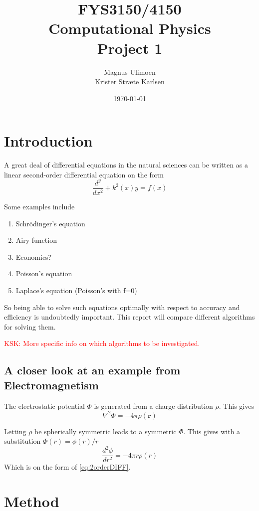 \documentclass[11pt,a4paper,english,draft]{article}
\title{FYS3150/4150\\Computational Physics\\Project 1}
\author{Magnus Ulimoen\\Krister Stræte Karlsen}
\date{\today}
\numberwithin{equation}{section}
\newcommand{\ve}[1]{\mathbf{#1}} %
\begin{document}
\maketitle

\section{Introduction}

A great deal of differential equations in the natural sciences can be written 
as a linear second-order differential equation on the form
\begin{equation}
\frac{d^y}{dx^2} + k^2(x)y = f(x)
\label{eq:2orderDIFF}
\end{equation}


Some examples include
\begin{enumerate}[label=\bfseries \Roman*]
\item Schrödinger's equation
\item Airy function
\item Economics?
\item Poisson's equation
\item Laplace's equation (Poisson's with f=0)
\end{enumerate}

So being able to solve such equations optimally with respect to accuracy and efficiency is undoubtedly important. This report will compare different algorithms for solving them.

\textcolor{red}{KSK: More specific info on which algorithms to be investigated. }  	


\subsection{A closer look at an example from Electromagnetism}

The electrostatic potential $\Phi$ is generated from a charge distribution $\rho$.
This gives
\begin{equation}
\nabla^2\Phi = -4\pi \rho(\ve{r})
\end{equation}

Letting $\rho$ be spherically symmetric leads to a symmetric $\Phi$.
This gives with a substitution $\Phi(r) = \phi(r)/r$
\begin{equation}
\frac{d^2\phi}{dr^2} = -4\pi r\rho(r)
\end{equation}
Which is on the form of \eqref{eq:2orderDIFF}.

\section{Method}
\end{document}
